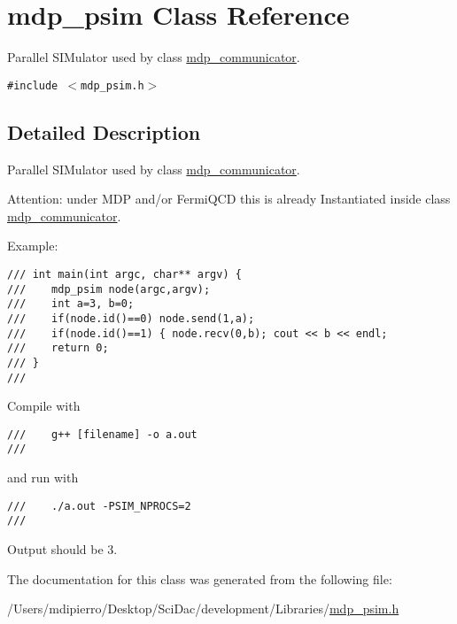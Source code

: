 \hypertarget{classmdp__psim}{
\section{mdp\_\-psim Class Reference}
\label{classmdp__psim}
}
Parallel SIMulator used by class \hyperlink{classmdp__communicator}{mdp\_\-communicator}.  


{\tt \#include $<$mdp\_\-psim.h$>$}



\subsection{Detailed Description}
Parallel SIMulator used by class \hyperlink{classmdp__communicator}{mdp\_\-communicator}. 

Attention: under MDP and/or FermiQCD this is already Instantiated inside class \hyperlink{classmdp__communicator}{mdp\_\-communicator}.

Example: 

\footnotesize\begin{verbatim}
/// int main(int argc, char** argv) {
///    mdp_psim node(argc,argv);
///    int a=3, b=0;
///    if(node.id()==0) node.send(1,a);
///    if(node.id()==1) { node.recv(0,b); cout << b << endl;
///    return 0;
/// }
/// \end{verbatim}
\normalsize
 Compile with 

\footnotesize\begin{verbatim}
///    g++ [filename] -o a.out
/// \end{verbatim}
\normalsize
 and run with 

\footnotesize\begin{verbatim}
///    ./a.out -PSIM_NPROCS=2
/// \end{verbatim}
\normalsize
 Output should be 3. 

The documentation for this class was generated from the following file:\begin{CompactItemize}
\item 
/Users/mdipierro/Desktop/SciDac/development/Libraries/\hyperlink{mdp__psim_8h}{mdp\_\-psim.h}\end{CompactItemize}
